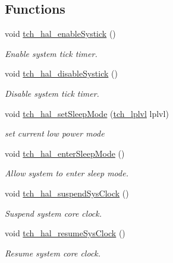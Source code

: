 \subsection*{Functions}
\begin{DoxyCompactItemize}
\item 
void \hyperlink{group___base___h_a_l___interface_ga30c39bad73b964910fc1da590532ba0d}{tch\+\_\+hal\+\_\+enable\+Systick} ()
\begin{DoxyCompactList}\small\item\em Enable system tick timer. \end{DoxyCompactList}\item 
void \hyperlink{group___base___h_a_l___interface_ga4a8a12649008359835ffe3ea13231636}{tch\+\_\+hal\+\_\+disable\+Systick} ()
\begin{DoxyCompactList}\small\item\em Disable system tick timer. \end{DoxyCompactList}\item 
void \hyperlink{group___base___h_a_l___interface_gac486d5f7e4f57a0e0613c2e3d5c82d27}{tch\+\_\+hal\+\_\+set\+Sleep\+Mode} (\hyperlink{group___base___h_a_l___interface_gafff60314f6cfca2764c81a05e4e4fb45}{tch\+\_\+lplvl} lplvl)
\begin{DoxyCompactList}\small\item\em set current low power mode \end{DoxyCompactList}\item 
void \hyperlink{group___base___h_a_l___interface_ga05f1af4a803137561ea0eab48ec1b4ce}{tch\+\_\+hal\+\_\+enter\+Sleep\+Mode} ()
\begin{DoxyCompactList}\small\item\em Allow system to enter sleep mode. \end{DoxyCompactList}\item 
void \hyperlink{group___base___h_a_l___interface_ga04dd1b9352864389bda0b95b21503825}{tch\+\_\+hal\+\_\+suspend\+Sys\+Clock} ()
\begin{DoxyCompactList}\small\item\em Suspend system core clock. \end{DoxyCompactList}\item 
void \hyperlink{group___base___h_a_l___interface_ga706cac4d6e7ae23025d6833d39156882}{tch\+\_\+hal\+\_\+resume\+Sys\+Clock} ()
\begin{DoxyCompactList}\small\item\em Resume system core clock. \end{DoxyCompactList}\end{DoxyCompactItemize}
